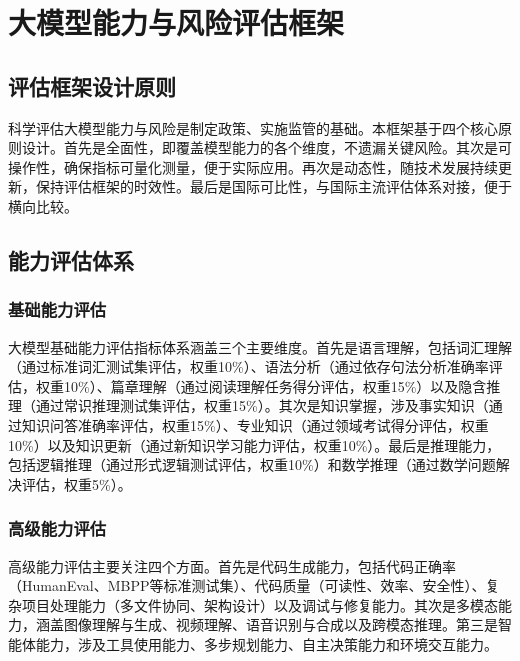 \appendix

\chapter{大模型能力与风险评估框架}
\label{app:framework}

\section{评估框架设计原则}

科学评估大模型能力与风险是制定政策、实施监管的基础。本框架基于四个核心原则设计。首先是全面性，即覆盖模型能力的各个维度，不遗漏关键风险。其次是可操作性，确保指标可量化测量，便于实际应用。再次是动态性，随技术发展持续更新，保持评估框架的时效性。最后是国际可比性，与国际主流评估体系对接，便于横向比较。

\section{能力评估体系}

\subsection{基础能力评估}

大模型基础能力评估指标体系涵盖三个主要维度。首先是语言理解，包括词汇理解（通过标准词汇测试集评估，权重10\%）、语法分析（通过依存句法分析准确率评估，权重10\%）、篇章理解（通过阅读理解任务得分评估，权重15\%）以及隐含推理（通过常识推理测试集评估，权重15\%）。其次是知识掌握，涉及事实知识（通过知识问答准确率评估，权重15\%）、专业知识（通过领域考试得分评估，权重10\%）以及知识更新（通过新知识学习能力评估，权重10\%）。最后是推理能力，包括逻辑推理（通过形式逻辑测试评估，权重10\%）和数学推理（通过数学问题解决评估，权重5\%）。

\subsection{高级能力评估}

高级能力评估主要关注四个方面。首先是代码生成能力，包括代码正确率（HumanEval、MBPP等标准测试集）、代码质量（可读性、效率、安全性）、复杂项目处理能力（多文件协同、架构设计）以及调试与修复能力。其次是多模态能力，涵盖图像理解与生成、视频理解、语音识别与合成以及跨模态推理。第三是智能体能力，涉及工具使用能力、多步规划能力、自主决策能力和环境交互能力。

